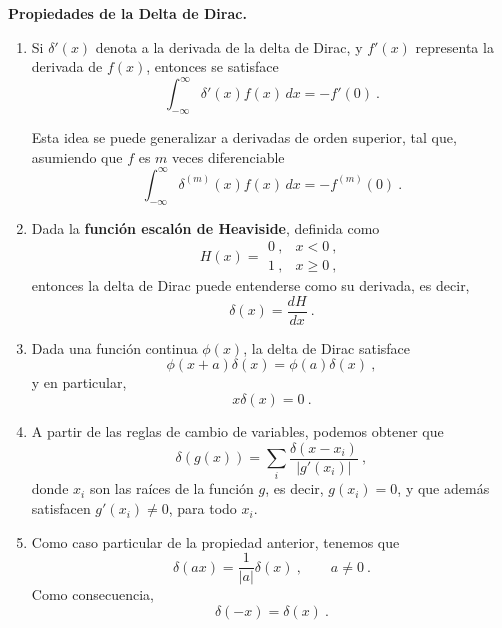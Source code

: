 \begin{propiedad}
    \textbf{Propiedades de la Delta de Dirac.}
    \begin{enumerate}
        \item Si $\delta'(x)$ denota a la derivada de la delta de Dirac, y $f'(x)$ representa la derivada de $f(x)$, entonces se satisface
        \begin{equation}
            \int_{-\infty}^{\infty} \delta'(x) f(x) \, dx = - f'(0) \ .
        \end{equation}

        Esta idea se puede generalizar a derivadas de orden superior, tal que, asumiendo que $f$ es $m$ veces diferenciable
        \begin{equation}
            \int_{-\infty}^{\infty} \delta^{(m)}(x) f(x) \, dx = - f^{(m)}(0) \ .
        \end{equation}

        \item Dada la \textbf{función escalón de Heaviside}, definida como
        \begin{equation}
            H(x) = \begin{array}{cc}
                0 \ , & x < 0 \ , \\
                1 \ , & x \geq 0 \ ,
            \end{array}
        \end{equation}
        entonces la delta de Dirac puede entenderse como su derivada, es decir,
        \begin{equation}
            \delta(x) = \frac{dH}{dx} \ .
        \end{equation}
        
        \item Dada una función continua $\phi(x)$, la delta de Dirac satisface
        \begin{equation}
            \phi(x+a) \delta(x) = \phi(a) \delta(x) \ ,
        \end{equation}
        y en particular,
        \begin{equation}
            x \delta(x) = 0 \ .
        \end{equation}
        \item A partir de las reglas de cambio de variables, podemos obtener que
        \begin{equation}
            \delta(g(x)) = \sum_i \frac{\delta(x-x_i)}{|g'(x_i)|} \ ,
        \end{equation}
        donde $x_i$ son las raíces de la función $g$, es decir, $g(x_i) = 0$, y que además satisfacen $g'(x_i) \neq 0$, para todo $x_i$.
        \item Como caso particular de la propiedad anterior, tenemos que
        \begin{equation}
            \delta(ax) = \frac{1}{|a|}\delta(x) \ , \qquad a \neq 0 \ .
        \end{equation}
        Como consecuencia,
        \begin{equation}
            \delta(-x) = \delta(x) \ .
        \end{equation}
    \end{enumerate}
\end{propiedad}

